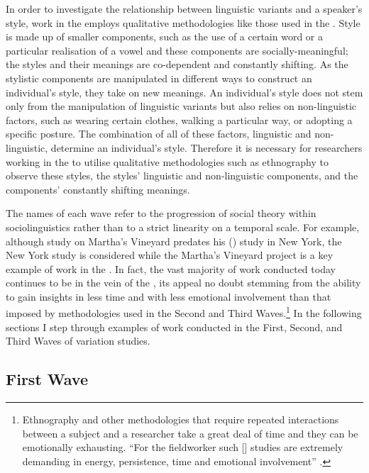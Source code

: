 In order to investigate the relationship between linguistic variants and a spea\-ker's style, work in the  employs qualitative methodologies like those used in the . Style is made up of smaller components, such as the use of a certain word or a particular realisation of a vowel and these components are socially-meaningful; the styles and their meanings are co-dependent and constantly shifting. As the stylistic components are manipulated in different ways to construct an individual's style, they take on new meanings. An individual's style does not stem only from the manipulation of linguistic variants but also relies on non-linguistic factors, such as wearing certain clothes, walking a particular way, or adopting a specific posture. The combination of all of these factors, linguistic and non-linguistic, determine an individual's style. Therefore it is necessary for researchers working in the  to utilise qualitative methodologies such as ethnography to observe these styles, the styles' linguistic and non-linguistic components, and the components' constantly shifting meanings.

The names of each wave refer to the progression of social theory within sociolinguistics rather than to a strict linearity on a temporal scale. For example, although  study on Martha's Vineyard predates his (\citeyear{labov1966}) study in New York, the New York study is considered  while the Martha's Vineyard project is a key example of work in the . In fact, the vast majority of work conducted today continues to be in the vein of the , its appeal no doubt stemming from the ability to gain insights in less time and with less emotional involvement than that imposed by methodologies used in the Second and Third Waves.\footnote{Ethnography and other methodologies that require repeated interactions between a subject and a researcher take a great deal of time and they can be emotionally exhausting. ``For the fieldworker such [] studies are extremely demanding in energy, persistence, time and emotional involvement'' \citep[79]{milroy1987}.}	 In the following sections I step through examples of work conducted in the First, Second, and Third Waves of variation studies.

\subsection{First Wave}

